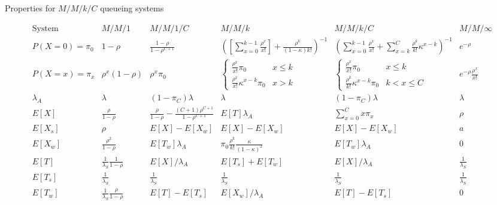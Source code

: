 \documentclass{article}
\newcommand{\utilization}{\rho}
\begin{document}
{\renewcommand{\arraystretch}{1.5}
\begin{sidewaystable}
\caption{Properties for $M/M/k/C$ queueing systems}
\label{tab:properties}
\[ \begin{array}{c|ccccc}
\mbox{System} & M/M/1 & M/M/1/C & M/M/k & M/M/k/C & M/M/\infty \\
\hline
P(X=0)=\pi_0 & 1-\utilization & \frac{1-\utilization}{1-\utilization^{C+1}} & 
\left(\left[\sum_{x=0}^{k-1} \frac{\utilization^x}{x!}\right] + \frac{\utilization^k}{(1-\kappa)k!}\right)^{-1} &
\left(\sum_{x=0}^{k-1} \frac{\utilization^x}{x!} + \sum_{x=k}^C \frac{\utilization^k}{k!}\kappa^{x-k} \right)^{-1} 
& e^{-\utilization} \\
P(X=x)=\pi_x & \utilization^x (1-\utilization) & \utilization^x \pi_0 & \left\{ \begin{array}{ll} \frac{\utilization^x}{x!}\pi_0 & x\le k \\ \frac{\utilization^x}{x!} \kappa^{x-k}\pi_0 & x>k \end{array} \right. 
& \left\{ \begin{array}{ll} \frac{\utilization^x}{x!}\pi_0 & x\le k \\ \frac{\utilization^k}{k!} \kappa ^{x-k}\pi_0 & k<x\le C \end{array} \right.   & e^{-\utilization} \frac{\utilization^x}{x!} \\
\hline
\lambda_A & \lambda & (1-\pi_C)\lambda & \lambda & (1-\pi_C)\lambda & \lambda \\
\hline
E[X] & \frac{\utilization}{1-\utilization} & \frac{\utilization}{1-\utilization} - \frac{(C+1)\utilization^{C+1}}{1-\utilization^{C+1}} & E[T]\lambda_A & \sum_{x=0}^C x \pi_x & \utilization \\
E[X_s] & \utilization & E[X]-E[X_w] & E[X]-E[X_w] & E[X]-E[X_w] & a \\
E[X_w] & \frac{\utilization^2}{1-\utilization} & E[T_w] \lambda_A & \pi_0 \frac{\utilization^k}{k!} \frac{\kappa}{(1-\kappa)^2} & E[T_w] \lambda_A& 0 \\
E[T] & \frac{1}{\lambda_S}\frac{1}{1-\utilization} & E[X]/\lambda_A & E[T_s]+E[T_w] & E[X]/\lambda_A & \frac{1}{\lambda_S} \\
E[T_s] & \frac{1}{\lambda_S} & \frac{1}{\lambda_S} & \frac{1}{\lambda_S} & \frac{1}{\lambda_S} & \frac{1}{\lambda_S} \\
E[T_w] & \frac{1}{\lambda_S}\frac{\utilization}{1-\utilization} & E[T]-E[T_s] & E[X_w] / \lambda_A  & E[T]-E[T_s]& 0 \\
\end{array} \]
\end{sidewaystable}
}
\end{document}
